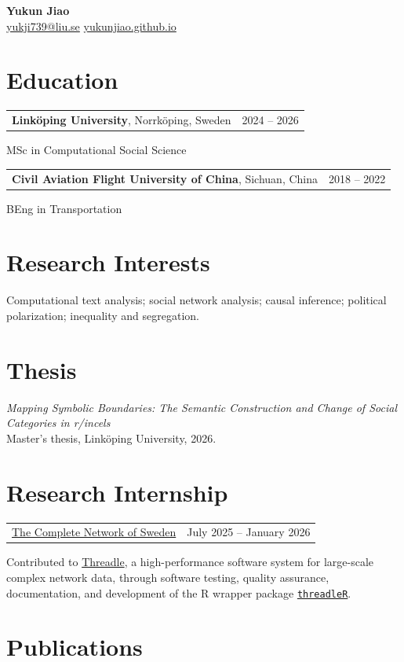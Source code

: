 \documentclass[11pt,a4paper]{article}
\makeatletter
\newcommand{\datedsubsection}[2]{%
  \vspace{3pt}
  \noindent\begin{tabular*}{\textwidth}{@{}>{\raggedright\arraybackslash}p{0.70\textwidth}@{\extracolsep{\fill}}r@{}}
    #1 & #2 \\
  \end{tabular*}
}
\makeatother
\begin{document}
\begin{center}
  {\LARGE \textbf{Yukun Jiao}}\\
  \vspace{4pt}
  \href{mailto:yukji739@liu.se}{yukji739@liu.se} \quad
  \href{https://yukunjiao.github.io}{yukunjiao.github.io}
\end{center}

\section{Education}

\datedsubsection{\textbf{Link\"oping University}, Norrk\"oping, Sweden}{2024 -- 2026}
MSc in Computational Social Science

\datedsubsection{\textbf{Civil Aviation Flight University of China}, Sichuan, China}{2018 -- 2022}
BEng in Transportation

\section{Research Interests}

Computational text analysis; social network analysis; causal inference; political polarization; inequality and segregation.

\section{Thesis}

\textit{Mapping Symbolic Boundaries: The Semantic Construction and Change of Social Categories
in r/incels}\\
Master's thesis, Link\"oping University, 2026.

\section{Research Internship}

\datedsubsection{\href{https://netreg.se}{The Complete Network of Sweden}}{July 2025 -- January 2026}
Contributed to \href{https://www.threadle.dev}{Threadle}, a high-performance software system for large-scale complex network data, through software testing, quality assurance, documentation, and development of the R wrapper package \href{https://github.com/YukunJiao/threadleR}{\texttt{threadleR}}.

\section{Publications}
\end{document}
